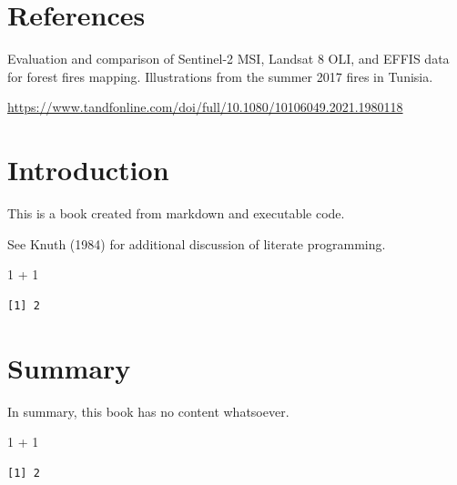 \documentclass[
  letterpaper,
  DIV=11,
  numbers=noendperiod]{scrreprt}
\newenvironment{Shaded}{\begin{snugshade}}{\end{snugshade}}
\newcommand{\DecValTok}[1]{\textcolor[rgb]{0.68,0.00,0.00}{#1}}
\newcommand{\SpecialCharTok}[1]{\textcolor[rgb]{0.37,0.37,0.37}{#1}}
\begin{document}

\hypertarget{references}{%
\chapter*{References}\label{references}}


Evaluation and comparison of Sentinel-2 MSI, Landsat 8 OLI, and EFFIS
data for forest fires mapping. Illustrations from the summer 2017 fires
in Tunisia.

\url{https://www.tandfonline.com/doi/full/10.1080/10106049.2021.1980118}


\hypertarget{introduction}{%
\chapter{Introduction}\label{introduction}}

This is a book created from markdown and executable code.

See Knuth (1984) for additional discussion of literate programming.

\begin{Shaded}
\begin{Highlighting}[]
\DecValTok{1} \SpecialCharTok{+} \DecValTok{1}
\end{Highlighting}
\end{Shaded}

\begin{verbatim}
[1] 2
\end{verbatim}


\hypertarget{summary-1}{%
\chapter{Summary}\label{summary-1}}

In summary, this book has no content whatsoever.

\begin{Shaded}
\begin{Highlighting}[]
\DecValTok{1} \SpecialCharTok{+} \DecValTok{1}
\end{Highlighting}
\end{Shaded}

\begin{verbatim}
[1] 2
\end{verbatim}
\end{document}
